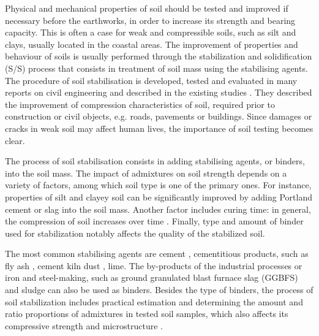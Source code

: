 \documentclass{amestyle}
\begin{document}
Physical and mechanical properties of soil should be tested and improved if necessary before the earthworks, in order to increase its strength and bearing capacity. This is often a case for weak and compressible soils, such as silt and clays, usually located in the coastal areas. The improvement of properties and behaviour of soils is usually performed through the stabilization and solidification (S/S) process that consists in treatment of soil mass using the stabilising agents. The procedure of soil stabilisation is developed, tested and evaluated in many reports on civil engineering and described in the existing studies \cite{Jauberthie,Lindh202102,ArabiWild,Lindh2004}. They described the improvement of compression characteristics of soil, required prior to construction or civil objects, e.g. roads, pavements or buildings. Since damages or cracks in weak soil may affect human lives, the importance of soil testing becomes clear. 

The process of soil stabilisation consists in adding stabilising agents, or binders, into the soil mass. The impact of admixtures on soil strength depends on a variety of factors, among which soil type is one of the primary ones. For instance, properties of silt and clayey soil can be significantly improved by adding Portland cement or slag into the soil mass. Another factor includes curing time: in general, the compression of soil increases over time \cite{Lindh202102}. Finally, type and amount of binder used for stabilization notably affects the quality of the stabilized soil. 

The most common stabilising agents are cement \cite{Rekik}, cementitious products, such as fly ash \cite{Tastan,Hasan}, cement kiln dust \cite{Solanki,Lindh2021a}, lime. The by-products of the industrial processes or iron and steel-making, such as ground granulated blast furnace slag (GGBFS) \cite{Mozejko} and sludge \cite{Ingunza,Sharif} can also be used as binders. Besides the type of binders, the process of soil stabilization includes practical estimation and determining the amount and ratio proportions of admixtures in tested soil samples, which also affects its compressive strength and microstructure \cite{Lindh2001,Ahmed}.
\end{document}
